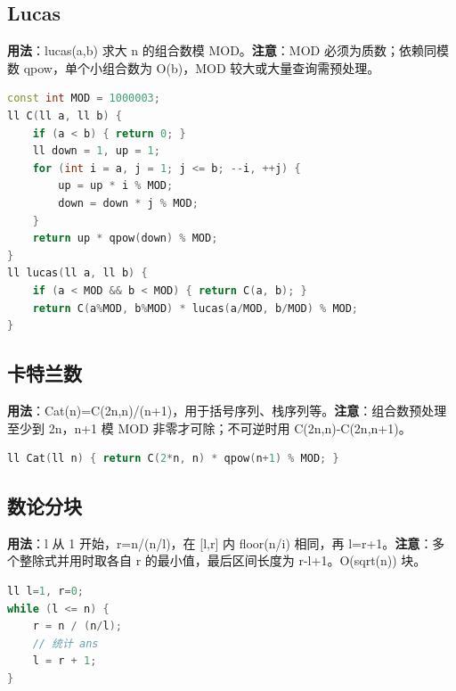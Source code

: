 \documentclass[a4paper,9pt]{extarticle}
\begin{document}
\subsection{Lucas}

\textbf{用法}：lucas(a,b) 求大 n 的组合数模 MOD。\textbf{注意}：MOD 必须为质数；依赖同模数 qpow，单个小组合数为 O(b)，MOD 较大或大量查询需预处理。

\begin{lstlisting}[language={C++}]
const int MOD = 1000003;
ll C(ll a, ll b) {
	if (a < b) { return 0; }
	ll down = 1, up = 1;
	for (int i = a, j = 1; j <= b; --i, ++j) {
		up = up * i % MOD;
		down = down * j % MOD;
	}
	return up * qpow(down) % MOD;
}
ll lucas(ll a, ll b) {
	if (a < MOD && b < MOD) { return C(a, b); }
	return C(a%MOD, b%MOD) * lucas(a/MOD, b/MOD) % MOD;
}
\end{lstlisting}

\subsection{卡特兰数}

\textbf{用法}：Cat(\allowbreak{}n)\allowbreak{}=\allowbreak{}C(\allowbreak{}2n,\allowbreak{}n)\allowbreak{}/\allowbreak{}(\allowbreak{}n+\allowbreak{}1)，用于括号序列、栈序列等。\textbf{注意}：组合数预处理至少到 2n，n+1 模 MOD 非零才可除；不可逆时用 C(\allowbreak{}2n,\allowbreak{}n)\allowbreak{}-\allowbreak{}C(\allowbreak{}2n,\allowbreak{}n+\allowbreak{}1)。

\begin{lstlisting}[language={C++}]
ll Cat(ll n) { return C(2*n, n) * qpow(n+1) % MOD; }
\end{lstlisting}

\subsection{数论分块}

\textbf{用法}：l 从 1 开始，r=\allowbreak{}n/\allowbreak{}(\allowbreak{}n/\allowbreak{}l)，在 [l,r] 内 floor(\allowbreak{}n/\allowbreak{}i) 相同，再 l=r+1。\textbf{注意}：多个整除式并用时取各自 r 的最小值，最后区间长度为 r-\allowbreak{}l+\allowbreak{}1。O(\allowbreak{}sqrt(\allowbreak{}n)\allowbreak{}) 块。

\begin{lstlisting}[language={C++}]
ll l=1, r=0;
while (l <= n) {
    r = n / (n/l);
    // 统计 ans
    l = r + 1;
}
\end{lstlisting}
\end{document}
